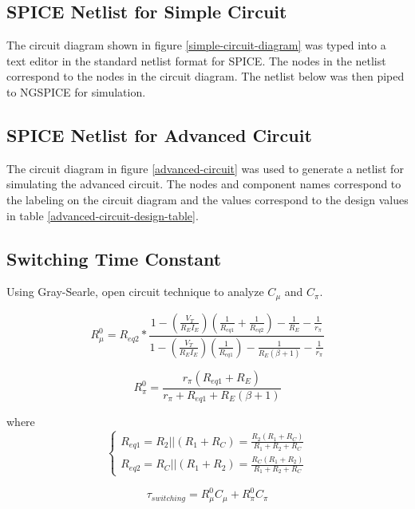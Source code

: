 \documentclass[titlepage, letterpaper, 10.5pt]{article}
\begin{document}
\clearpage
\subsection{SPICE Netlist for Simple Circuit}
\label{simple-circuit-netlist}

The circuit diagram shown in figure \ref{simple-circuit-diagram} was typed into a text editor
in the standard netlist format for SPICE. The nodes in the netlist correspond to the
nodes in the circuit diagram. The netlist below was then piped to NGSPICE for simulation.



\clearpage
\subsection{SPICE Netlist for Advanced Circuit}
\label{advanced-circuit-netlist}

The circuit diagram in figure \ref{advanced-circuit} was used to generate a netlist for
simulating the advanced circuit. The nodes and component names correspond to the labeling
on the circuit diagram and the values correspond to the design values in table
\ref{advanced-circuit-design-table}.



\subsection{Switching Time Constant}

Using Gray-Searle, open circuit technique to analyze $C_{\mu}$ and $C_{\pi}$.

\begin{equation}
R_{\mu}^{0}=R_{eq2}*\frac
{1-\left(\frac{V_{T}}{R_{E}I_{E}}\right) \left( \frac{1}{R_{eq1}}+\frac{1}{R_{eq2}}\right)-\frac{1}{R_{E}}-\frac{1}{r_{\pi}}}
{1-\left(\frac{V_{T}}{R_{E}I_{E}}\right) \left( \frac{1}{R_{eq1}} \right) -\frac{1}{R_{E}(\beta+1)}-\frac{1}{r_{\pi}}}
\end{equation}

\begin{equation}
R_{\pi}^{0}=\frac{r_{\pi}(R_{eq1}+R_{E})}{r_{\pi}+R_{eq1}+R_{E}(\beta+1)}
\end{equation}

where
\begin{equation}
\left\{\begin{array}{lr}
R_{eq1}=R_{2}||(R_{1}+R_{C})=\frac{R_{2}(R_{1}+R_{C})}{R_{1}+R_{2}+R_{C}}	\\
R_{eq2}=R_{C}||(R_{1}+R_{2})=\frac{R_{C}(R_{1}+R_{2})}{R_{1}+R_{2}+R_{C}}
\end{array}\right.
\end{equation}

\begin{equation}
\tau_{switching}=R_{\mu}^{0}C_{\mu}+R_{\pi}^{0}C_{\pi}
\end{equation}
\end{document}
